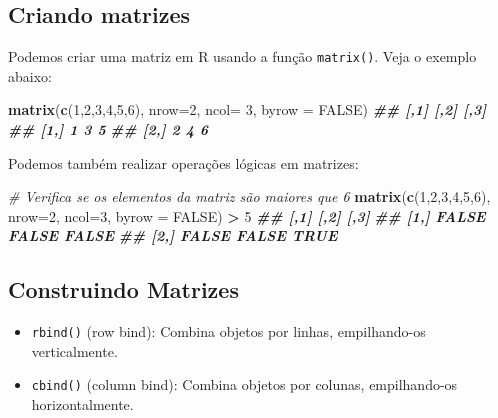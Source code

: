 \documentclass[
]{book}
\newenvironment{Shaded}{\begin{snugshade}}{\end{snugshade}}
\newcommand{\AttributeTok}[1]{\textcolor[rgb]{0.13,0.29,0.53}{#1}}
\newcommand{\CommentTok}[1]{\textcolor[rgb]{0.56,0.35,0.01}{\textit{#1}}}
\newcommand{\ConstantTok}[1]{\textcolor[rgb]{0.56,0.35,0.01}{#1}}
\newcommand{\DecValTok}[1]{\textcolor[rgb]{0.00,0.00,0.81}{#1}}
\newcommand{\DocumentationTok}[1]{\textcolor[rgb]{0.56,0.35,0.01}{\textbf{\textit{#1}}}}
\newcommand{\FunctionTok}[1]{\textcolor[rgb]{0.13,0.29,0.53}{\textbf{#1}}}
\newcommand{\NormalTok}[1]{#1}
\newcommand{\SpecialCharTok}[1]{\textcolor[rgb]{0.81,0.36,0.00}{\textbf{#1}}}
\providecommand{\tightlist}{%
  \setlength{\itemsep}{0pt}\setlength{\parskip}{0pt}}
\begin{document}
\subsection{Criando matrizes}\label{criando-matrizes}

Podemos criar uma matriz em R usando a função \texttt{matrix()}. Veja o exemplo
abaixo:

\begin{Shaded}
\begin{Highlighting}[]
\FunctionTok{matrix}\NormalTok{(}\FunctionTok{c}\NormalTok{(}\DecValTok{1}\NormalTok{,}\DecValTok{2}\NormalTok{,}\DecValTok{3}\NormalTok{,}\DecValTok{4}\NormalTok{,}\DecValTok{5}\NormalTok{,}\DecValTok{6}\NormalTok{), }\AttributeTok{nrow=}\DecValTok{2}\NormalTok{, }\AttributeTok{ncol=} \DecValTok{3}\NormalTok{, }\AttributeTok{byrow =} \ConstantTok{FALSE}\NormalTok{)}
\DocumentationTok{\#\#      [,1] [,2] [,3]}
\DocumentationTok{\#\# [1,]    1    3    5}
\DocumentationTok{\#\# [2,]    2    4    6}
\end{Highlighting}
\end{Shaded}

Podemos também realizar operações lógicas em matrizes:

\begin{Shaded}
\begin{Highlighting}[]
\CommentTok{\# Verifica se os elementos da matriz são maiores que 6}
\FunctionTok{matrix}\NormalTok{(}\FunctionTok{c}\NormalTok{(}\DecValTok{1}\NormalTok{,}\DecValTok{2}\NormalTok{,}\DecValTok{3}\NormalTok{,}\DecValTok{4}\NormalTok{,}\DecValTok{5}\NormalTok{,}\DecValTok{6}\NormalTok{), }\AttributeTok{nrow=}\DecValTok{2}\NormalTok{, }\AttributeTok{ncol=}\DecValTok{3}\NormalTok{, }\AttributeTok{byrow =} \ConstantTok{FALSE}\NormalTok{) }\SpecialCharTok{\textgreater{}} \DecValTok{5}
\DocumentationTok{\#\#       [,1]  [,2] [,3]}
\DocumentationTok{\#\# [1,] FALSE FALSE FALSE}
\DocumentationTok{\#\# [2,] FALSE FALSE TRUE}
\end{Highlighting}
\end{Shaded}

\subsection{Construindo Matrizes}\label{construindo-matrizes}

\begin{itemize}
\tightlist
\item
  \texttt{rbind()} (row bind): Combina objetos por linhas, empilhando-os
  verticalmente.
\item
  \texttt{cbind()} (column bind): Combina objetos por colunas, empilhando-os
  horizontalmente.
\end{itemize}
\end{document}
